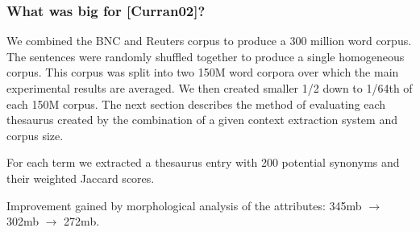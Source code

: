 \begin{frame}[plain]
	\frametitle{What was big for [Curran02]?}
	\begin{block}{}
    We combined the BNC and Reuters corpus to
    produce a 300 million word corpus. The sentences
    were randomly shuffled together to produce a single homogeneous
    corpus. This corpus was split into 
    two 150M word corpora over which the main experimental results are
    averaged. We then created smaller 1/2 down to 1/64th of each 150M
    corpus. The next section describes the method of evaluating each
    thesaurus created by the combination of a given context extraction  
    system and corpus size.
	\end{block} 
	\begin{block}{}
    For each term we extracted a thesaurus entry with 200 
    potential synonyms and their weighted Jaccard scores.
	\end{block} 
	\begin{block}{}
    Improvement gained by morphological analysis of the attributes: 
    345mb $\rightarrow$ 302mb $\rightarrow$ 272mb.
	\end{block} 
\end{frame}
